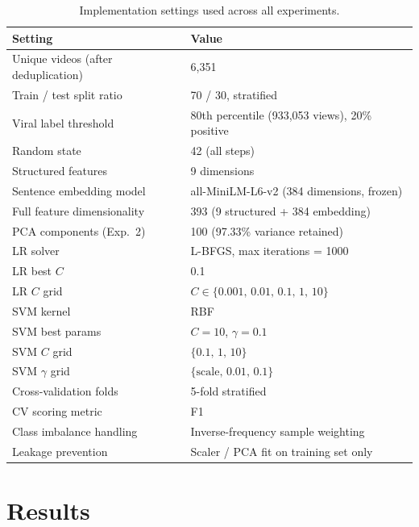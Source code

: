 \documentclass[12pt,a4paper]{article}
\begin{document}
\begin{table}[H]
  \centering
  \caption{Implementation settings used across all experiments.}
  \label{tab:impl}
  \begin{tabular}{ll}
    \toprule
    \textbf{Setting} & \textbf{Value} \\
    \midrule
    Unique videos (after deduplication) & 6,351 \\
    Train / test split ratio  & 70 / 30, stratified \\
    Viral label threshold     & 80th percentile (933,053 views), 20\% positive \\
    Random state              & 42 (all steps) \\
    Structured features       & 9 dimensions \\
    Sentence embedding model  & all-MiniLM-L6-v2 (384 dimensions, frozen) \\
    Full feature dimensionality & 393 (9 structured + 384 embedding) \\
    PCA components (Exp.\ 2)  & 100 (97.33\% variance retained) \\
    LR solver                 & L-BFGS, max iterations = 1000 \\
    LR best $C$               & 0.1 \\
    LR $C$ grid               & $C \in \{0.001,\,0.01,\,0.1,\,1,\,10\}$ \\
    SVM kernel                & RBF \\
    SVM best params           & $C=10$, $\gamma=0.1$ \\
    SVM $C$ grid              & $\{0.1,\,1,\,10\}$ \\
    SVM $\gamma$ grid         & $\{\text{scale},\,0.01,\,0.1\}$ \\
    Cross-validation folds    & 5-fold stratified \\
    CV scoring metric         & F1 \\
    Class imbalance handling  & Inverse-frequency sample weighting \\
    Leakage prevention        & Scaler / PCA fit on training set only \\
    \bottomrule
  \end{tabular}
\end{table}

\section{Results}
\label{sec:results}
\end{document}
